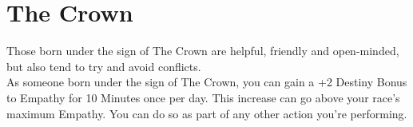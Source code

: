 \section{The Crown}\label{zodiac:crown}

Those born under the sign of The Crown are helpful, friendly and open-minded, but also tend to try and avoid conflicts.\\
As someone born under the sign of The Crown, you can gain a +2 Destiny Bonus to Empathy for 10 Minutes once per day.
This increase can go above your race's maximum Empathy.
You can do so as part of any other action you're performing.\\